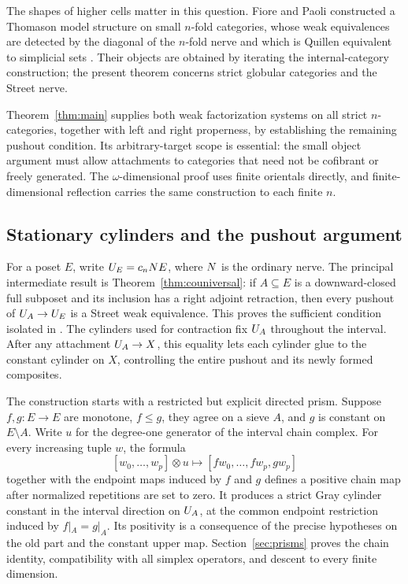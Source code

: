 The shapes of higher cells matter in this question. Fiore and Paoli
constructed a Thomason model structure on small $n$-fold categories,
whose weak equivalences are detected by the diagonal of the $n$-fold
nerve and which is Quillen equivalent to simplicial sets
\cite[Theorem~9.28]{FiorePaoli2010}.
Their objects are obtained by iterating the internal-category
construction; the present theorem concerns strict globular categories
and the Street nerve.

Theorem~\ref{thm:main} supplies both weak factorization systems on all
strict $n$-categories, together with left and right properness, by
establishing the remaining pushout condition. Its arbitrary-target
scope is essential: the small object argument must allow attachments
to categories that need not be cofibrant or freely generated.
The $\omega$-dimensional proof uses finite orientals directly, and
finite-dimensional reflection carries the same construction to each
finite $n$.

\subsection*{Stationary cylinders and the pushout argument}
For a poset $E$, write $U_{E}=c_nN E$, where $N$ is the ordinary
nerve. The principal intermediate result is
Theorem~\ref{thm:couniversal}: if $A\subseteq E$ is a downward-closed
full subposet and its inclusion has a right adjoint retraction, then
every pushout of $U_{A}\to U_{E}$ is a Street weak equivalence.
This proves the sufficient condition isolated in
\cite[Scholie~5.14, condition~(d$'$)]{AraMaltsiniotis2014}.
The cylinders used for contraction fix $U_{A}$ throughout the interval.
After any attachment $U_{A}\to X$, this equality lets each
cylinder glue to the constant cylinder on $X$, controlling the entire
pushout and its newly formed composites.

The construction starts with a restricted but explicit directed prism.
Suppose $f,g:E\to E$ are monotone, $f\le g$, they agree on a sieve $A$,
and $g$ is constant on $E\setminus A$. Write $u$ for the degree-one
generator of the interval chain complex. For every increasing tuple $w$,
the formula
\[
 [w_0,\ldots,w_p]\otimes u
 \longmapsto [fw_0,\ldots,fw_p,gw_p]
\]
together with the endpoint maps induced by $f$ and $g$ defines a positive
chain map after normalized repetitions are set to zero. It produces a
strict Gray cylinder constant in the interval direction on $U_{A}$,
at the common endpoint restriction induced by $f|_A=g|_A$.
Its positivity is a consequence of the precise hypotheses on the old
part and the constant upper map. Section~\ref{sec:prisms} proves the
chain identity, compatibility with all simplex operators, and descent
to every finite dimension.

